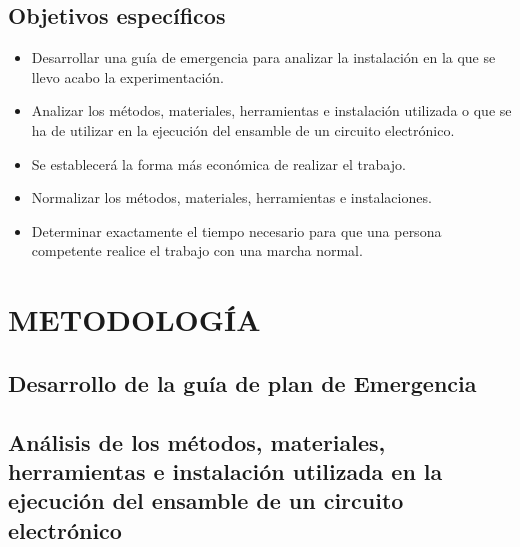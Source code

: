     \subsection{Objetivos específicos }
    \begin{itemize}
        \item Desarrollar una guía de emergencia para analizar la instalación en la que se llevo acabo la experimentación.
        \item Analizar los métodos, materiales, herramientas e instalación utilizada o que se ha de utilizar en la ejecución del ensamble de un circuito electrónico.
        \item Se establecerá la forma más económica de realizar el trabajo.
        \item Normalizar los métodos, materiales, herramientas e instalaciones.
        \item Determinar exactamente el tiempo necesario para que una persona competente realice el trabajo con una marcha normal.
    \end{itemize}
    
    \section{METODOLOGÍA}
    
    
    \subsection{Desarrollo de la guía de plan de Emergencia}
    
    
    \subsection{Análisis de los métodos, materiales, herramientas e instalación utilizada en la ejecución del ensamble de un circuito electrónico}
    
